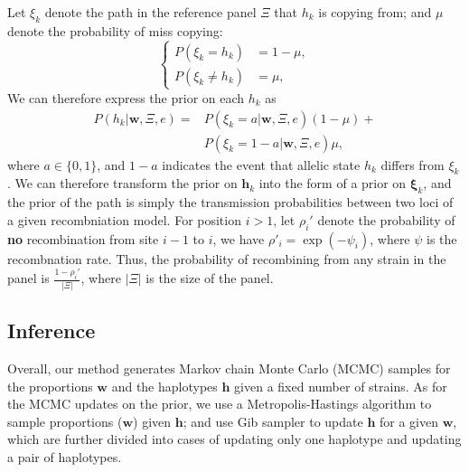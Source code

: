 \documentclass{bioinfo}
\begin{document}
\begin{itemize}
Let $\xi_k$ denote the path in the reference panel $\Xi$ that $h_k$ is copying from; and $\mu$ denote the probability of miss copying:
$$\begin{cases}
P(\xi_k = h_k) &= 1-\mu, \\
P(\xi_k \neq h_k) &= \mu,\end{cases}$$
We can therefore express the prior on each $h_k$ as
\begin{equation}
\begin{split}
P (h_k|\mathbf{w}, \Xi, e) = & P (\xi_k = a|\mathbf{w}, \Xi, e) (1-\mu) +\\
                             & P (\xi_k = 1-a|\mathbf{w}, \Xi, e) \mu,
\end{split}\label{eqn:prior_on_h}
\end{equation}
where $a \in \{0, 1\}$, and $1-a$ indicates the event that allelic state $h_k$ differs from $\xi_k$. We can therefore transform the prior on $\mathbf{h}_k$ into the form of a prior on $\mathbf{\xi}_k$, and the prior of the path is simply the transmission probabilities between two loci of a given recombniation model. For position $i > 1$, let $\rho_i'$ denote the probability of {\bf no} recombination from site $i-1$ to $i$, we have $\rho'_i = \exp(-\psi_i)$, where $\psi$ is the recombnation rate. Thus, the probability of recombining from any strain in the panel is $\displaystyle\frac{1-\rho_i'}{|\Xi|}$, where $|\Xi|$ is the size of the panel.

\end{itemize}





\subsection{Inference}

Overall, our method generates Markov chain Monte Carlo (MCMC) samples for the proportions $\mathbf w$ and the haplotypes $\mathbf h$ given a fixed number of strains. As for the MCMC updates on the prior, we use a Metropolis-Hastings algorithm to sample proportions ($\mathbf w$) given $\mathbf h$; and use Gib sampler to update $\mathbf h$ for a given $\mathbf w$, which are further divided into cases of updating only one haplotype and updating a pair of haplotypes.
\end{document}
